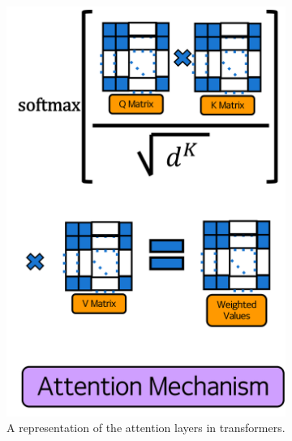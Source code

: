 \documentclass[12pt]{article}
\begin{document}
{\begin{figure}
\begin{subfigure}[b]{0.3\textwidth}
         \includegraphics[width=\textwidth]{images/attention.png}
         \caption{A representation of the attention layers in transformers.}
         \label{fig:attention}
     \end{subfigure}
     \hfill
     \begin{subfigure}[b]{0.3\textwidth}
         \centering

\end{subfigure}
\end{figure}}
\end{document}

